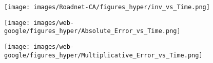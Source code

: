 \begin{figure*}[htbp]
\begin{subfigure}[b]{\textwidth}
\begin{minipage}[b]{0.3\textwidth}
			\texttt{[image: images/Roadnet-CA/figures\_hyper/inv\_vs\_Time.png]} %
		\end{minipage}
	\end{subfigure}
	\begin{subfigure}[b]{\textwidth}
	\centering
	\begin{minipage}[b]{0.05\textwidth}
		\centering
	\end{minipage}%
	\begin{minipage}[b]{0.3\textwidth}
		\centering
		\texttt{[image: images/web-google/figures\_hyper/Absolute\_Error\_vs\_Time.png]} %
		
	\end{minipage}%
	\begin{minipage}[b]{0.3\textwidth}
		\centering
		
		\texttt{[image: images/web-google/figures\_hyper/Multiplicative\_Error\_vs\_Time.png]} %
		
	\end{minipage}%
	\begin{minipage}[b]{0.3\textwidth}
		\centering
		

\end{minipage}
\end{subfigure}
\end{figure*}
